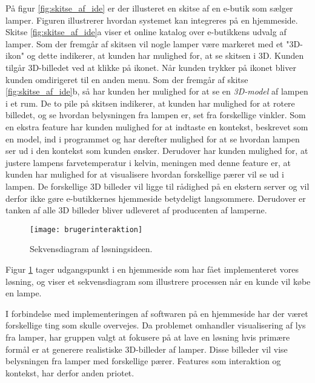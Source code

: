 På figur \ref{fig:skitse_af_ide} er der illusteret en skitse af en e-butik som sælger lamper. Figuren illustrerer hvordan systemet kan integreres på en hjemmeside. Skitse \ref{fig:skitse_af_ide}a viser et online katalog over e-butikkens udvalg af lamper. Som der fremgår af skitsen vil nogle lamper være markeret med et "3D-ikon" og dette indikerer, at kunden har mulighed for, at se skitsen i 3D. Kunden tilgår 3D-billedet ved at klikke på ikonet. Når kunden trykker på ikonet bliver kunden omdirigeret til en anden menu. Som der fremgår af skitse \ref{fig:skitse_af_ide}b, så har kunden her mulighed for at se en \textit{3D-model} af lampen i et rum. De to pile på skitsen indikerer, at kunden har mulighed for at rotere billedet, og se hvordan belysningen fra lampen er, set fra forskellige vinkler. Som en ekstra feature har kunden mulighed for at indtaste en kontekst, beskrevet som en model, ind i programmet og har derefter mulighed for at se hvordan lampen ser ud i den kontekst som kunden ønsker. 
Derudover har kunden mulighed for, at justere lampens farvetemperatur i kelvin, meningen med denne feature er, at kunden har mulighed for at visualisere hvordan forskellige pærer vil se ud i lampen. De forskellige 3D billeder vil ligge til rådighed på en ekstern server og vil derfor ikke gøre e-butikkernes hjemmeside betydeligt langsommere. Derudover er tanken af alle 3D billeder bliver udleveret af producenten af lamperne. 

\begin{figure}[H]
   \centering
   \texttt{[image: brugerinteraktion]}
   \caption{Sekvensdiagram af løsningsideen.}
   \label{fig:sekvensdiagram_af_ideen}
\end{figure}

Figur \ref{fig:sekvensdiagram_af_ideen} tager udgangspunkt i en hjemmeside som har fået implementeret vores løsning, og viser et sekvensdiagram som illustrere processen når en kunde vil købe en lampe.  

I forbindelse med implementeringen af softwaren på en hjemmeside har der været forskellige ting som skulle overvejes. Da problemet omhandler visualisering af lys fra lamper, har gruppen valgt at fokusere på at lave en løsning hvis primære formål er at generere realistiske 3D-billeder af lamper. Disse billeder vil vise belysningen fra lamper med forskellige pærer. Features som interaktion og kontekst, har derfor anden priotet. 

